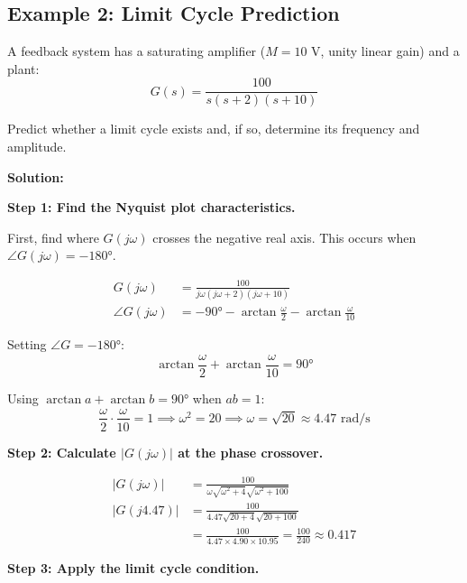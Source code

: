 \subsection{Example 2: Limit Cycle Prediction}

\begin{example}
\label{ex:limit_cycle_saturation}
A feedback system has a saturating amplifier ($M = 10$ V, unity linear gain) and a plant:
\begin{equation}
G(s) = \frac{100}{s(s+2)(s+10)}
\end{equation}

Predict whether a limit cycle exists and, if so, determine its frequency and amplitude.

\textbf{Solution:}

\textbf{Step 1: Find the Nyquist plot characteristics.}

First, find where $G(j\omega)$ crosses the negative real axis. This occurs when $\angle G(j\omega) = -180°$.

\begin{align}
G(j\omega) &= \frac{100}{j\omega(j\omega+2)(j\omega+10)} \\
\angle G(j\omega) &= -90° - \arctan\frac{\omega}{2} - \arctan\frac{\omega}{10}
\end{align}

Setting $\angle G = -180°$:
\begin{equation}
\arctan\frac{\omega}{2} + \arctan\frac{\omega}{10} = 90°
\end{equation}

Using $\arctan a + \arctan b = 90°$ when $ab = 1$:
\begin{equation}
\frac{\omega}{2} \cdot \frac{\omega}{10} = 1 \implies \omega^2 = 20 \implies \omega = \sqrt{20} \approx 4.47 \text{ rad/s}
\end{equation}

\textbf{Step 2: Calculate $|G(j\omega)|$ at the phase crossover.}

\begin{align}
|G(j\omega)| &= \frac{100}{\omega\sqrt{\omega^2+4}\sqrt{\omega^2+100}} \\
|G(j4.47)| &= \frac{100}{4.47\sqrt{20+4}\sqrt{20+100}} \\
&= \frac{100}{4.47 \times 4.90 \times 10.95} = \frac{100}{240} \approx 0.417
\end{align}

\textbf{Step 3: Apply the limit cycle condition.}


\end{example}
